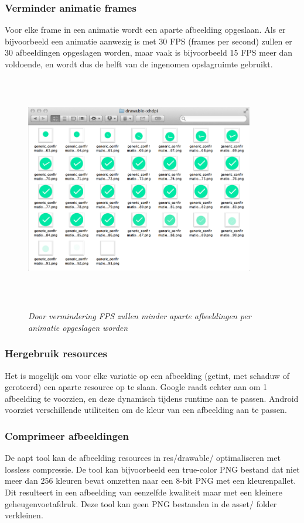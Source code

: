 \subsubsection{Verminder animatie frames }
\label{sec:reduceanimationframes}
Voor elke frame in een animatie wordt een aparte afbeelding opgeslaan. Als er bijvoorbeeld een animatie aanwezig is met 30 FPS (frames per second) zullen er 30 afbeeldingen opgeslagen worden, maar vaak is bijvoorbeeld 15 FPS meer dan voldoende, en wordt dus de helft van de ingenomen opslagruimte gebruikt.
\begin{figure}[H]
	\centering
	\caption{\textit{Door vermindering FPS zullen minder aparte afbeeldingen per animatie opgeslagen worden}\newline}
	\includegraphics[width=10cm, height=10cm, keepaspectratio]{img/animation-frames}\\[.5cm]
	
\end{figure}
\subsubsection{Hergebruik resources }
\label{sec:reuseresources}
Het is mogelijk om voor elke variatie op een afbeelding (getint, met schaduw of geroteerd) een aparte resource op te slaan. Google raadt echter aan om 1 afbeelding te voorzien, en deze dynamisch tijdens runtime aan te passen. 
Android voorziet verschillende utiliteiten om de kleur van een afbeelding aan te passen.
\subsubsection{Comprimeer afbeeldingen }
\label{sec:compressimages}
De aapt tool kan de afbeelding resources in res/drawable/ optimaliseren met lossless compressie. De tool kan bijvoorbeeld een true-color PNG bestand dat niet meer dan 256 kleuren bevat omzetten naar een 8-bit PNG met een kleurenpallet. Dit resulteert in een afbeelding van eenzelfde kwaliteit maar met een kleinere geheugenvoetafdruk. Deze tool kan geen PNG bestanden in de asset/ folder verkleinen. 

